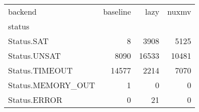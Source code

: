 \begin{tabular}{lrrr}
\toprule
backend & baseline & lazy & nuxmv \\
status &  &  &  \\
\midrule
Status.SAT & 8 & 3908 & 5125 \\
Status.UNSAT & 8090 & 16533 & 10481 \\
Status.TIMEOUT & 14577 & 2214 & 7070 \\
Status.MEMORY_OUT & 1 & 0 & 0 \\
Status.ERROR & 0 & 21 & 0 \\
\bottomrule
\end{tabular}
